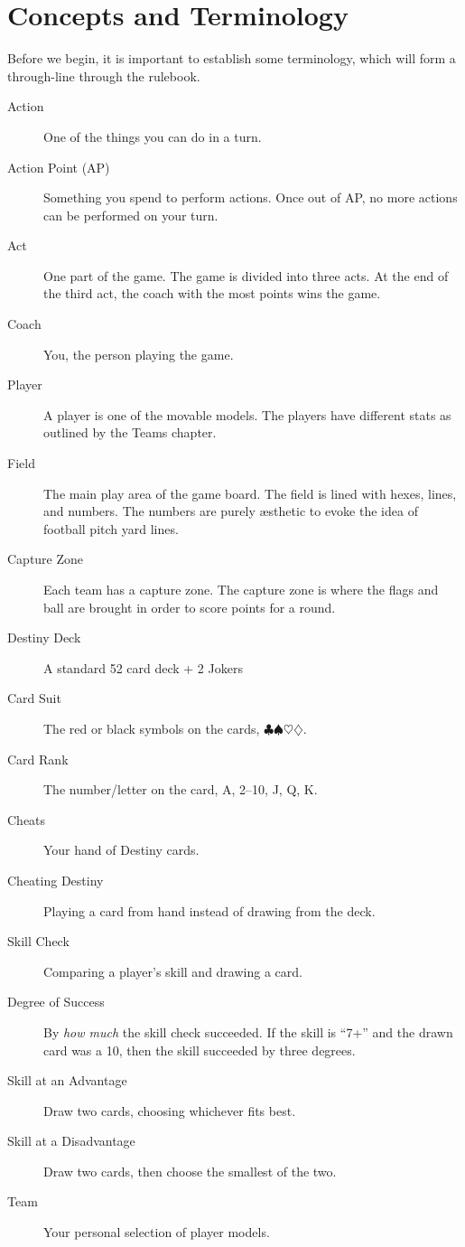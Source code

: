 \chapter{Concepts and Terminology}
Before we begin, it is important to establish some terminology, which will form a through-line through the rulebook.

\begin{description}
\item[Action] One of the things you can do in a turn.
\item[Action Point (AP)] Something you spend to perform actions. Once out of AP, no more actions can be performed on your turn.
\item[Act] One part of the game. The game is divided into three acts. At the end of the third act, the coach with the most points wins the game.
\item[Coach] You, the person playing the game.
\item[Player] A player is one of the movable models.
The players have different stats as outlined by the Teams chapter.
\item[Field] The main play area of the game board. The field is lined with hexes, lines, and numbers. The numbers are purely æsthetic to evoke the idea of football pitch yard lines.
\item[Capture Zone] Each team has a capture zone.
The capture zone is where the flags and ball are brought in order to score points for a round.
\item[Destiny Deck] A standard 52 card deck + 2 Jokers
\item[Card Suit] The red or black symbols on the cards, $\clubsuit\spadesuit\heartsuit\diamondsuit$.
\item[Card Rank] The number/letter on the card, A, 2--10, J, Q, K.
\item[Cheats] Your hand of Destiny cards.
\item[Cheating Destiny] Playing a card from hand instead of drawing from the deck.
\item[Skill Check] Comparing a player's skill and drawing a \destiny{} card.
\item[Degree of Success] By \textit{how much} the skill check succeeded. If the skill is ``7+'' and the drawn card was a 10, then the skill succeeded by three degrees. 
\item[Skill at an Advantage] Draw two cards, choosing whichever fits best.
\item[Skill at a Disadvantage] Draw two cards, then choose the smallest of the two.
\item[Team] Your personal selection of player models.
\end{description}